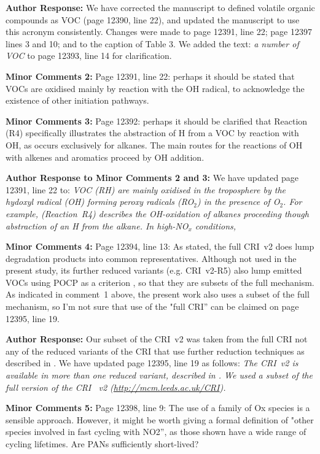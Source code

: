 \documentclass{article}
\begin{document}
\textbf{Author Response:} We have corrected the manuscript to defined volatile organic compounds as VOC (page 12390, line 22), and updated the manuscript to use this acronym consistently. Changes were made to page 12391, line 22; page 12397 lines 3 and 10; and to the caption of Table 3.
We added the text: \textit{a number of VOC} to page 12393, line 14 for clarification.

\textbf{Minor Comments 2:} Page 12391, line 22: perhaps it should be stated that VOCs are oxidised mainly by reaction with the OH radical, to acknowledge the existence of other initiation pathways.

\textbf{Minor Comments 3:} Page 12392: perhaps it should be clarified that Reaction (R4) specifically illustrates the abstraction of H from a VOC by reaction with OH, as occurs exclusively for alkanes. The main routes for the reactions of OH with alkenes and aromatics proceed by OH addition.

\textbf{Author Response to Minor Comments 2 and 3:} We have updated page 12391, line 22 to: \textit{VOC (RH) are mainly oxidised in the troposphere by the hydoxyl radical (OH) forming peroxy radicals (RO$_2$) in the presence of O$_2$. For example, (Reaction~R4) describes the OH-oxidation of alkanes proceeding though abstraction of an H from the alkane. In high-NO$_{x}$ conditions,}

\textbf{Minor Comments 4:} Page 12394, line 13: As stated, the full CRI~v2 does lump degradation products into common representatives. Although not used in the present study, its further reduced variants (e.g. CRI~v2-R5) also lump emitted VOCs using POCP as a criterion \citep{Watson:2008}, so that they are subsets of the full mechanism. As indicated in comment~1 above, the present work also uses a subset of the full mechanism, so I'm not sure that use of the "full CRI'' can be claimed on page 12395, line 19.

\textbf{Author Response:} Our subset of the CRI~v2 was taken from the full CRI not any of the reduced variants of the CRI that use further reduction techniques as described in \citet{Watson:2008}.
We have updated page 12395, line 19 as follows: \textit{The CRI~v2 is available in more than one reduced variant, described in \citet{Watson:2008}. We used a subset of the full version of the CRI~ v2 (\url{http://mcm.leeds.ac.uk/CRI}).}

\textbf{Minor Comments 5:} Page 12398, line 9: The use of a family of Ox species is a sensible approach. However, it might be worth giving a formal definition of "other species involved in fast cycling with NO2'', as those shown have a wide range of cycling lifetimes. Are PANs sufficiently short-lived?
\end{document}
